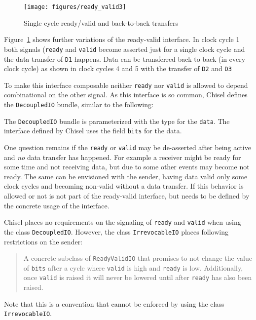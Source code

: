 \documentclass[%
    10pt,
    headinclude, footexclude,
    openright, %
    notitlepage,
    cleardoubleempty,
    headsepline,
    pointlessnumbers,
    bibtotoc, idxtotoc,
    ]{scrbook}
\newcommand{\code}[1]{{\small{\texttt{#1}}}}
\begin{document}
\begin{figure}
  \centering
  \texttt{[image: figures/ready\_valid3]}
  \caption{Single cycle ready/valid and back-to-back transfers}
  \label{fig:ready_valid3}
\end{figure}

Figure~\ref{fig:ready_valid3} shows further variations of the ready-valid
interface. In clock cycle 1 both signals (\code{ready} and \code{valid}
become asserted just for a single clock cycle and the data transfer
of \code{D1} happens. Data can be transferred back-to-back (in every
clock cycle) as shown in clock cycles 4 and 5 with the transfer of
\code{D2} and \code{D3}

To make this interface composable neither \code{ready} nor \code{valid} is
allowed to depend combinational on the other signal.
As this interface is so common, Chisel defines the \code{DecoupledIO}
bundle, similar to the following:


\noindent The \code{DecoupledIO} bundle is parameterized with the type for
the \code{data}. The interface defined by Chisel uses the field \code{bits}
for the data.

One question remains if the \code{ready} or \code{valid} may be de-asserted
after being active and \emph{no} data transfer has happened.
For example a receiver might be ready for some time and not receiving data, but
due to some other events may become not ready.
The same can be envisioned with the sender, having data valid only some
clock cycles and becoming non-valid without a data transfer.
If this behavior is allowed or not is not part of the ready-valid interface,
but needs to be defined by the concrete usage of the interface.

Chisel places no requirements on the signaling of \code{ready} and \code{valid}
when using the class \code{DecoupledIO}.
However, the class \code{IrrevocableIO} places following restrictions
on the sender:

\begin{quote}
A concrete subclass of \code{ReadyValidIO} that promises to not change
the value of \code{bits} after a cycle where \code{valid} is high and \code{ready} is low.
Additionally, once \code{valid} is raised it will never be lowered until after
\code{ready} has also been raised.
\end{quote}

\noindent Note that this is a convention that cannot be enforced by using the class
\code{IrrevocableIO}.
\end{document}
